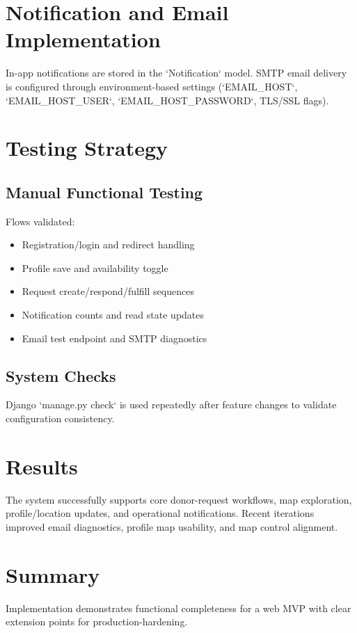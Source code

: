 \documentclass[12pt,a4paper]{report}
\begin{document}
\section{Notification and Email Implementation}
In-app notifications are stored in the `Notification` model. SMTP email delivery is configured through environment-based settings (`EMAIL_HOST`, `EMAIL_HOST_USER`, `EMAIL_HOST_PASSWORD`, TLS/SSL flags).

\section{Testing Strategy}
\subsection{Manual Functional Testing}
Flows validated:
\begin{itemize}[leftmargin=1.5em]
\item Registration/login and redirect handling
\item Profile save and availability toggle
\item Request create/respond/fulfill sequences
\item Notification counts and read state updates
\item Email test endpoint and SMTP diagnostics
\end{itemize}

\subsection{System Checks}
Django `manage.py check` is used repeatedly after feature changes to validate configuration consistency.

\section{Results}
The system successfully supports core donor-request workflows, map exploration, profile/location updates, and operational notifications. Recent iterations improved email diagnostics, profile map usability, and map control alignment.

\section{Summary}
Implementation demonstrates functional completeness for a web MVP with clear extension points for production-hardening.

\end{document}
